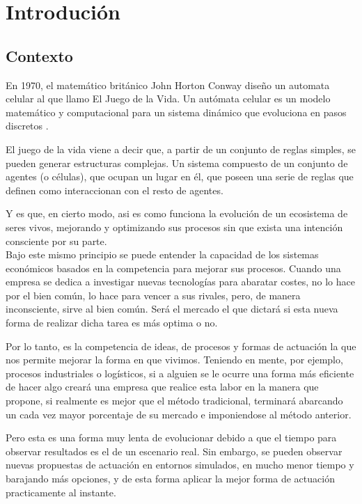 \documentclass[11pt]{article}
\begin{document}
	\section{Introdución}
		\subsection{Contexto}
			En 1970, el matemático británico John Horton Conway diseño un automata celular al que llamo El Juego de la Vida.
			Un autómata celular es un modelo matemático y computacional para un sistema dinámico que evoluciona en pasos discretos \cite{automata-celular}.

			El juego de la vida viene a decir que, a partir de un conjunto de reglas simples, se pueden generar estructuras complejas.
			Un sistema compuesto de un conjunto de agentes (o células), que ocupan un lugar en él, que poseen una serie de reglas 
			que definen como interaccionan con el resto de agentes.

			Y es que, en cierto modo, asi es como funciona la evolución de un ecosistema de seres vivos, mejorando y optimizando sus procesos sin que exista
			una intención consciente por su parte. \\

			Bajo este mismo principio se puede entender la capacidad de los sistemas económicos basados en la competencia para mejorar sus procesos. 
			Cuando una empresa se dedica a investigar nuevas tecnologías para abaratar costes, no lo hace por el bien común, lo hace para vencer a sus rivales,
			pero, de manera inconsciente, sirve al bien común. Será el mercado el que dictará si esta nueva forma de realizar dicha tarea es más optima o no.

			Por lo tanto, es la competencia de ideas, de procesos y formas de actuación la que
			nos permite mejorar la forma en que vivimos.
			Teniendo en mente, por ejemplo, procesos industriales o logísticos, 
			si a alguien se le ocurre una forma más eficiente de hacer algo creará una empresa que realice esta labor en la manera que propone, 
			si realmente es mejor que el método tradicional, 
			terminará abarcando un cada vez mayor porcentaje de su mercado e imponiendose al método anterior. 

			Pero esta es una forma muy lenta de evolucionar debido a que el tiempo para observar resultados es el de un escenario real.
			Sin embargo, se pueden observar nuevas propuestas de actuación en entornos simulados, en mucho menor tiempo y barajando más opciones, y de esta forma aplicar
			la mejor forma de actuación practicamente al instante. \\
			
\end{document}
